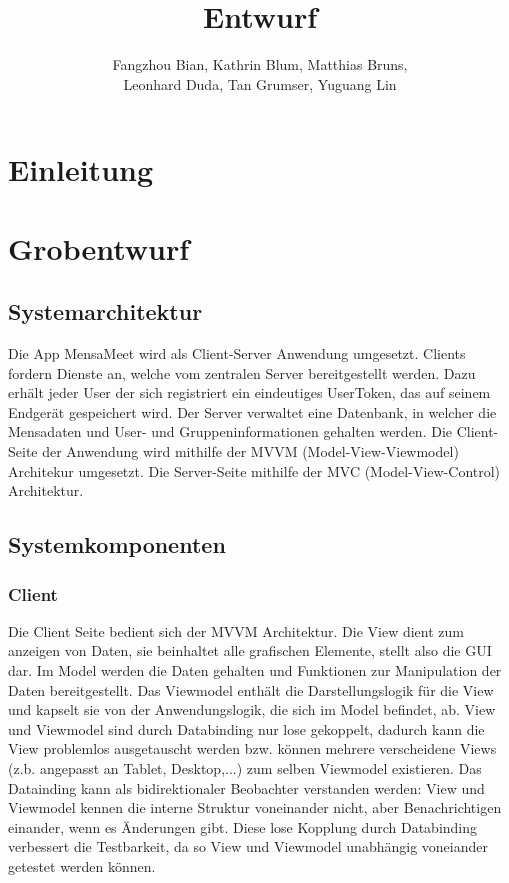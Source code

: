 \documentclass[a4paper]{scrreprt}
\begin{document}
\title{Entwurf}
\author{Fangzhou Bian, Kathrin Blum, Matthias Bruns, \\Leonhard Duda, Tan Grumser, Yuguang Lin}
\maketitle
\tableofcontents



\chapter{Einleitung}

\chapter{Grobentwurf}
\section{Systemarchitektur}
Die App MensaMeet wird als Client-Server Anwendung umgesetzt. Clients fordern Dienste an, welche vom zentralen Server bereitgestellt werden. Dazu erhält jeder User der sich registriert ein eindeutiges UserToken, das auf seinem Endgerät gespeichert wird. Der Server verwaltet eine Datenbank, in welcher die Mensadaten und User- und Gruppeninformationen gehalten werden. 
Die Client-Seite der Anwendung wird mithilfe der MVVM (Model-View-Viewmodel) Architekur umgesetzt.
Die Server-Seite mithilfe der MVC (Model-View-Control) Architektur.
\section{Systemkomponenten}

\subsection{Client}
Die Client Seite bedient sich der MVVM Architektur. Die View dient zum anzeigen von Daten, sie beinhaltet alle grafischen Elemente, stellt also die GUI dar. Im Model werden die Daten gehalten und Funktionen zur Manipulation der Daten bereitgestellt.
Das Viewmodel enthält die Darstellungslogik für die View und kapselt sie von der Anwendungslogik, die sich im Model befindet, ab.
View und Viewmodel sind durch Databinding nur lose gekoppelt, dadurch kann die View problemlos ausgetauscht werden bzw. können mehrere verscheidene Views (z.b. angepasst an Tablet, Desktop,...) zum selben Viewmodel existieren.
Das Datainding kann als bidirektionaler Beobachter verstanden werden: View und Viewmodel kennen die interne Struktur voneinander nicht, aber Benachrichtigen einander, wenn es Änderungen gibt. Diese lose Kopplung durch Databinding verbessert die Testbarkeit, da so View und Viewmodel unabhängig voneiander getestet werden können.
\end{document}
